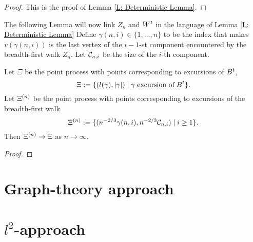 \begin{proof}
	This is the proof of Lemma \ref{L: Deterministic Lemma}. 
\end{proof}


The following Lemma will now link $Z_n$ and $W^t$ in the language of Lemma \ref{L: Deterministic Lemma}
Define $\gamma (n, i) \in \{1, \dots, n\}$ to be the index that makes
$v(\gamma(n,i))$ is the last vertex of the $i-1$-st component encountered by the breadth-first walk $Z_n$.
Let $\mathcal{C}_{n,i}$ be the size of the $i$-th component.

\begin{lemma} \label{L: Lemma 8}
	Let $\Xi$ be the point process with points corresponding to excursions of $B^t$,
	\begin{equation}
	\Xi := \{ (l(\gamma), |\gamma|) \; | \; \gamma \; \text{excursion of} \; B^t \}.
	\end{equation}
	Let $\Xi^{(n)}$ be the point process with points corresponding to excursions of the breadth-first walk
	\begin{equation}
	\Xi^{(n)} := \{ ( n^{-2 / 3} \gamma(n,i), n^{-2 / 3} \mathcal{C}_{n,i} ) \; | \; i \geq 1 \}.
	\end{equation}
	Then $\Xi^{(n)} \rightarrow \Xi$ as $n \rightarrow \infty$.
\end{lemma}
\begin{proof}
\end{proof}

















\section{Graph-theory approach}

\section{$l^2$-approach}
